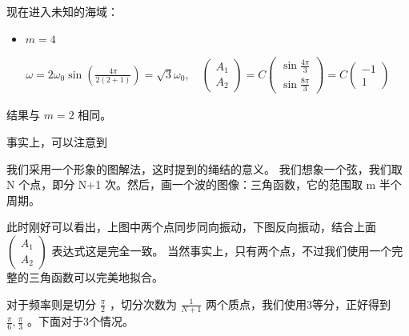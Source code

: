 \documentclass[11pt]{book}
\begin{document}
现在进入未知的海域：
\begin{itemize}
\item \(m=4\)
\end{itemize}
\begin{align*}
\omega = 2\omega_0\sin(\frac{4\pi}{2(2+1)})=\sqrt{3}\omega_0 ,\quad
\begin{pmatrix}
A_1\\A_2
\end{pmatrix}
=C
\begin{pmatrix}
\sin \frac{4\pi}{3}\\\sin \frac{8\pi}{3}
\end{pmatrix}=C
\begin{pmatrix}
-1\\1
\end{pmatrix}
\end{align*}

结果与 \(m=2\) 相同。

事实上，可以注意到

我们采用一个形象的图解法，这时提到的绳结的意义。
我们想象一个弦，我们取 N 个点，即分 N+1 次。然后，画一个波的图像：三角函数，它的范围取 m 半个周期。

此时刚好可以看出，上图中两个点同步同向振动，下图反向振动，结合上面 \(\begin{pmatrix}
A_1\\A_2
\end{pmatrix}\) 表达式这是完全一致。
当然事实上，只有两个点，不过我们使用一个完整的三角函数可以完美地拟合。

对于频率则是切分 \(\frac{\pi}{2}\) ，切分次数为 \(\frac{1}{N+1}\) 两个质点，我们使用3等分，正好得到 \(\frac{\pi}{6},\frac{\pi}{3}\) 。下面对于3个情况。
\end{document}

